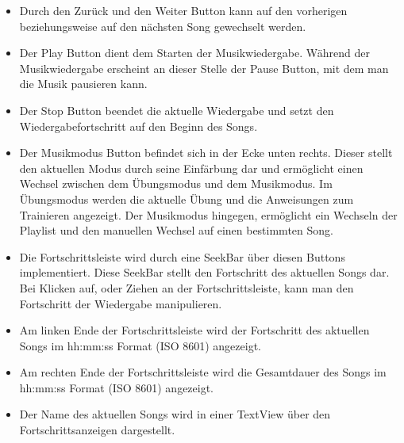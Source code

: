 \documentclass[FIPLY_base.tex]{subfiles}
\begin{document}
\begin{itemize}
\item Durch den Zurück und den Weiter Button kann auf den vorherigen beziehungsweise auf den nächsten Song gewechselt werden. 
\item Der Play Button dient dem Starten der Musikwiedergabe. \newline
Während der Musikwiedergabe erscheint an dieser Stelle der Pause Button, mit dem man die Musik pausieren kann. 
\item Der Stop Button beendet die aktuelle Wiedergabe und setzt den Wiedergabefortschritt auf den Beginn des Songs. 
\item Der Musikmodus Button befindet sich in der Ecke unten rechts. \newline
Dieser stellt den aktuellen Modus durch seine Einfärbung dar und ermöglicht einen Wechsel zwischen dem Übungsmodus und dem Musikmodus.
Im Übungsmodus werden die aktuelle Übung und die Anweisungen zum Trainieren angezeigt. \newline
Der Musikmodus hingegen, ermöglicht ein Wechseln der Playlist und den manuellen Wechsel auf einen bestimmten Song. 
\item Die Fortschrittsleiste wird durch eine SeekBar über diesen Buttons implementiert. Diese SeekBar stellt den Fortschritt des aktuellen Songs dar. 
Bei Klicken auf, oder Ziehen an der Fortschrittsleiste, kann man den Fortschritt der Wiedergabe manipulieren. 
\item Am linken Ende der Fortschrittsleiste wird der Fortschritt des aktuellen Songs im hh:mm:ss Format (ISO 8601) angezeigt. 
\item Am rechten Ende der Fortschrittsleiste wird die Gesamtdauer des Songs im hh:mm:ss Format (ISO 8601) angezeigt.
\item Der Name des aktuellen Songs wird in einer TextView über den Fortschrittsanzeigen dargestellt.
\end{itemize}
\end{document}

